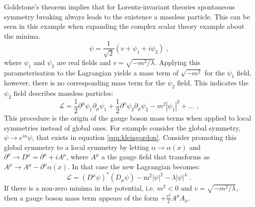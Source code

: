 Goldstone's theorem \cite{Goldstone:1962es} implies that for Lorentz-invariant theories spontaneous symmetry breaking always leads to the existence a massless particle.  This can be seen in this example when expanding the complex scalar theory example about the minima.
%
\begin{equation}
\psi = \frac{1}{\sqrt{2}}(v + \psi_{1} + i \psi_{2}) \text{ ,}
\end{equation}
%
\noindent where $\psi_{1}$ and $\psi_{2}$ are real fields and $v = \sqrt{-m^{2}/\lambda}$.  Applying this parameterisation to the Lagrangian yields a mass term of $\sqrt{-m^{2}}$ for the $\psi_{1}$ field, however, there is no corresponding mass term for the $\psi_{2}$ field.  This indicates the $\psi_{2}$ field describes massless particles:
%
\begin{equation}
\mathcal{L} = \frac{1}{2}\partial^{\mu} \psi_{1} \partial_{\mu} \psi_{1} + \frac{1}{2}\partial^{\mu} \psi_{2} \partial_{\mu} \psi_{2} - m^{2}|\psi_{1}|^{2} + ... \text{ ,}
\end{equation}
%
\noindent This procedure is the origin of the gauge boson mass terms when applied to local symmetries instead of global ones.  For example consider the global symmetry, $\psi \rightarrow e^{i\alpha} \psi$, that exists in equation \ref{equ:kleingordon}.  Consider promoting this global symmetry to a local symmetry by letting $\alpha \rightarrow \alpha(x)$ and $\partial^{\mu} \rightarrow D^{\mu} = \partial^{\mu} + iA^{\mu}$, where $A^{\mu}$ a the gauge field that transforms as $A^{\mu} \rightarrow A^{\mu} - \partial^{\mu}\alpha(x)$.  In that case the new Lagrangian becomes:
%
\begin{equation}
\mathcal{L} = (D^{\mu} \psi)^{*} (D_{\mu} \psi) - \text{m}^{2} |\psi|^{2} - \lambda |\psi|^{4} \text{ .}
\end{equation}
%
\noindent If there is a non-zero minima in the potential, i.e. $m^{2} < 0$ and $v = \sqrt{-m^{2}/\lambda}$, then a gauge boson mass term appears of the form $+\frac{v^{2}}{2} A^{\mu} A_{\mu}$.


